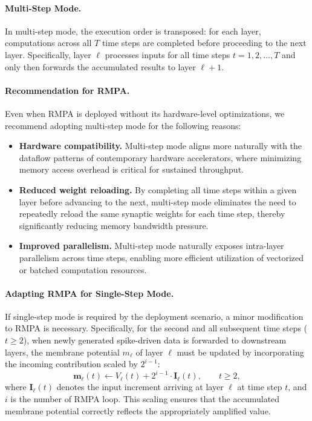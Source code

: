 \paragraph{Multi-Step Mode.}
In multi-step mode, the execution order is transposed: for each layer, computations 
across all $T$ time steps are completed before proceeding to the next layer. 
Specifically, layer $\ell$ processes inputs for all time steps $t = 1, 2, \ldots, T$ 
and only then forwards the accumulated results to layer $\ell+1$.

\paragraph{Recommendation for RMPA.}
Even when RMPA is deployed without its hardware-level optimizations, we recommend 
adopting multi-step mode for the following reasons:

\begin{itemize}[leftmargin=*, nosep]
    \item \textbf{Hardware compatibility.} Multi-step mode aligns more naturally with 
    the dataflow patterns of contemporary hardware accelerators, where minimizing 
    memory access overhead is critical for sustained throughput.

    \item \textbf{Reduced weight reloading.} By completing all time steps within a 
    given layer before advancing to the next, multi-step mode eliminates the need to 
    repeatedly reload the same synaptic weights for each time step, thereby 
    significantly reducing memory bandwidth pressure.

    \item \textbf{Improved parallelism.} Multi-step mode naturally exposes 
    intra-layer parallelism across time steps, enabling more efficient utilization of 
    vectorized or batched computation resources.
\end{itemize}

\paragraph{Adapting RMPA for Single-Step Mode.}
If single-step mode is required by the deployment scenario, a minor modification to 
RMPA is necessary. Specifically, for the second and all subsequent time steps 
($t \geq 2$), when newly generated spike-driven data is forwarded to downstream 
layers, the membrane potential $m_\ell$ of layer $\ell$ must be updated by incorporating 
the incoming contribution scaled by $2^{i-1}$:
\begin{equation}
    \mathbf{m}_\ell(t) \leftarrow V_\ell(t) + 2^{i-1} \cdot \mathbf{I}_\ell(t), \qquad t \geq 2,
\end{equation}
where $\mathbf{I}_\ell(t)$ denotes the input increment arriving at layer $\ell$ at time step $t$, 
and $i$ is the number of RMPA loop. This scaling ensures that the accumulated membrane 
potential correctly reflects the appropriately amplified value.

